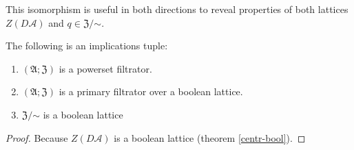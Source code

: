 This isomorphism is useful in both directions to reveal properties
of both lattices $Z(D\mathcal{A})$ and $q\in\mathfrak{Z}/\mathord\sim$.
\begin{cor}
\label{frac-is-bool}The following is an implications tuple:
\begin{enumerate}
\item $(\mathfrak{A};\mathfrak{Z})$ is a powerset filtrator.
\item $(\mathfrak{A};\mathfrak{Z})$ is a primary filtrator over a boolean
lattice.
\item $\mathfrak{Z}/\mathord\sim$ is a boolean lattice
\end{enumerate}
\end{cor}
\begin{proof}
Because $Z(D\mathcal{A})$ is a boolean lattice (theorem \ref{centr-bool}).
\end{proof}

